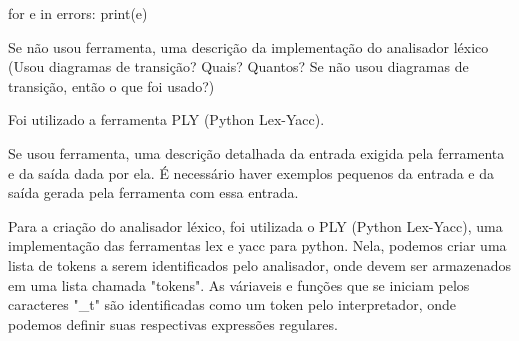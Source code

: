 \documentclass{exam}
\begin{document}
\begin{questions}
\begin{solution}
\begin{python}
    for e in errors:
        print(e)
            \end{python}
        \end{solution}
    \question Se não usou ferramenta, uma descrição da implementação do analisador
     léxico (Usou diagramas de transição? Quais? Quantos? Se não usou
    diagramas de transição, então o que foi usado?)
        \begin{solution}
            Foi utilizado a ferramenta PLY (Python Lex-Yacc).
        \end{solution}

    \question Se usou ferramenta, uma descrição detalhada da entrada exigida
    pela ferramenta e da saída dada por ela. É necessário haver exemplos
    pequenos da entrada e da saída gerada pela ferramenta com essa entrada.
        \begin{solution}
            Para a criação do analisador léxico, foi utilizada o PLY (Python Lex-Yacc),
            uma implementação das ferramentas lex e yacc para python. Nela, podemos
            criar uma lista de tokens a serem identificados pelo analisador, onde devem
            ser armazenados em uma lista chamada "tokens". As váriaveis
            e funções que se iniciam pelos caracteres "\_t" são identificadas como um token
            pelo interpretador, onde podemos definir suas respectivas expressões regulares.
        \end{solution}

\end{questions}
\end{document}
